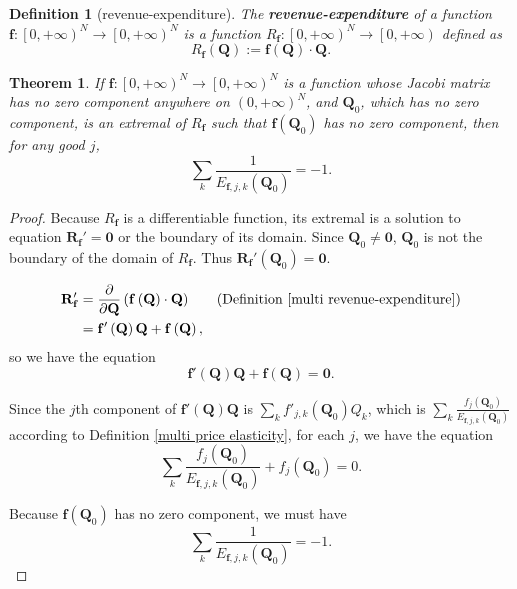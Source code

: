 \documentclass{article}
\newtheorem{theorem}{Theorem}[subsection]
\newtheorem{definition}{Definition}[subsection]
\begin{document}
\begin{definition}[revenue-expenditure]
\label{multi revenue-expenditure}
The \textbf{revenue-expenditure} of a function $\mathbf f:\left[0,+\infty\right)^N\to\left[0,+\infty\right)^N$ is a function $R_\mathbf f:\left[0,+\infty\right)^N\to\left[0,+\infty\right)$ defined as
$$R_\mathbf f\left(\mathbf Q\right):=\mathbf f\left(\mathbf Q\right)\cdot\mathbf Q.$$
\end{definition}

\begin{theorem}
If $\mathbf f:\left[0,+\infty\right)^N\to\left[0,+\infty\right)^N$ is a function whose Jacobi matrix has no zero component anywhere on $\left(0,+\infty\right)^N$, and $\mathbf Q_0$, which has no zero component, is an extremal of $R_\mathbf f$ such that $\mathbf f\left(\mathbf Q_0\right)$ has no zero component, then for any good $j$,
$$\sum_k\frac1{E_{\mathbf f,j,k}\left(\mathbf Q_0\right)}=-1.$$
\end{theorem}
\begin{proof}
Because $R_\mathbf f$ is a differentiable function, its extremal is a solution to equation $\mathbf R_\mathbf f'=\mathbf0$ or the boundary of its domain.
Since $\mathbf Q_0\ne\mathbf0$, $\mathbf Q_0$ is not the boundary of the domain of $R_\mathbf f$.
Thus $\mathbf R_\mathbf f'\left(\mathbf Q_0\right)=\mathbf0$.

\begin{align*}
\mathbf R_\mathbf f'&=\frac\partial{\partial\mathbf Q}\left(\mathbf f\left(\mathbf Q\right)\cdot\mathbf Q\right)&&\text{(Definition \ref{multi revenue-expenditure})}\\
&=\mathbf f'\left(\mathbf Q\right)\mathbf Q+\mathbf f\left(\mathbf Q\right),
\end{align*}
so we have the equation
$$\mathbf f'\left(\mathbf Q\right)\mathbf Q+\mathbf f\left(\mathbf Q\right)=\mathbf0.$$

Since the $j$th component of $\mathbf f'\left(\mathbf Q\right)\mathbf Q$ is $\sum_kf'_{j,k}\left(\mathbf Q_0\right)Q_k$, which is $\sum_k\frac{f_j\left(\mathbf Q_0\right)}{E_{\mathbf f,j,k}\left(\mathbf Q_0\right)}$ according to Definition \ref{multi price elasticity},
for each $j$, we have the equation
$$\sum_k\frac{f_j\left(\mathbf Q_0\right)}{E_{\mathbf f,j,k}\left(\mathbf Q_0\right)}+f_j\left(\mathbf Q_0\right)=0.$$

Because $\mathbf f\left(\mathbf Q_0\right)$ has no zero component,
we must have
$$\sum_k\frac1{E_{\mathbf f,j,k}\left(\mathbf Q_0\right)}=-1.$$
\end{proof}
\end{document}
